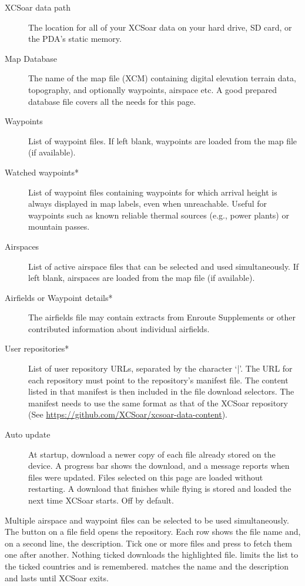 \begin{description}
\item[XCSoar data path]  The location for all of your XCSoar data on your hard drive, 
  SD card, or the PDA's static memory.
\item[Map Database]  The name of the map file (XCM) containing digital elevation
  terrain data, topography, and optionally waypoints, airspace etc. A good
  prepared database file covers all the needs for this page.
\item[Waypoints] List of waypoint files. If left blank, waypoints are loaded
  from the map file (if available).

\item[Watched waypoints*] \label{conf:watched-wps} List of waypoint files containing
  waypoints for which arrival height is always displayed in map labels, even
  when unreachable. Useful for waypoints such as known reliable thermal sources
  (e.g., power plants) or mountain passes.
\item[Airspaces]  List of active airspace files that can be selected and used
  simultaneously.  If left blank,
  airspaces are loaded from the map file (if available).
\item[Airfields or Waypoint details*]  The airfields file may contain extracts from
  Enroute Supplements or other contributed information about individual airfields.
\item[User repositories*] List of user repository URLs, separated by the character `|'.
  The URL for each repository must point to the repository's manifest file. 
  The content listed in that manifest is then included in the file download 
  selectors. The manifest needs to use the same format as that of the XCSoar repository
  (See \url{https://github.com/XCSoar/xcsoar-data-content}).
\item[Auto update] At startup, download a newer copy of each file already
  stored on the device. A progress bar shows the download, and a message
  reports when files were updated. Files selected on this page are loaded
  without restarting. A download that finishes while flying is stored and
  loaded the next time XCSoar starts. Off by default.
  
\end{description}


Multiple airspace and waypoint files can be selected to be used simultaneously.
The  button on a file field opens the repository. Each
row shows the file name and, on a second line, the description. Tick one
or more files and press  to fetch them one after another.
Nothing ticked downloads the highlighted file.  limits
the list to the ticked countries and is remembered. 
matches the name and the description and lasts until XCSoar exits.

